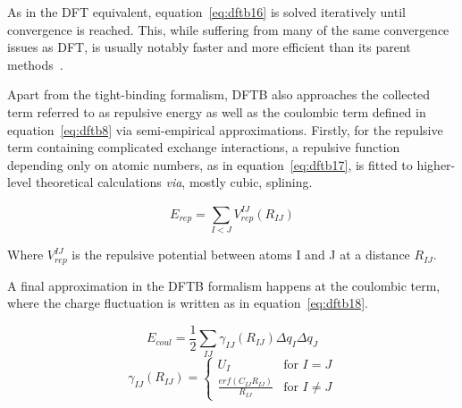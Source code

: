 \documentclass[11pt]{article}
\begin{document}
\bigskip

\noindent As in the DFT equivalent, equation~\ref{eq:dftb16} is solved iteratively until convergence is reached.
This, while suffering from many of the same convergence issues as DFT, is usually notably faster and more efficient than its parent methods~\cite{Elstner2014-zp}.
\\ \par \noindent Apart from the tight-binding formalism, DFTB also approaches the collected term referred to as repulsive energy as well as the coulombic term defined in equation~\ref{eq:dftb8} via semi-empirical approximations.
Firstly, for the repulsive term containing complicated exchange interactions, a repulsive function depending only on atomic numbers, as in equation~\ref{eq:dftb17}, is fitted to higher-level theoretical calculations \textit{via}, mostly cubic, splining.

\begin{equation}
  E_{rep} = \sum_{I<J}^{}V_{rep}^{IJ}(R_{IJ})
  \label{eq:dftb17}
\end{equation}

\bigskip

\noindent Where $V_{rep}^{IJ}$ is the repulsive potential between atoms I and J at a distance $R_{IJ}$.
\\ \par \noindent A final approximation in the DFTB formalism happens at the coulombic term, where the charge fluctuation is written as in equation~\ref{eq:dftb18}.

\begin{equation}
  E_{coul} = \frac{1}{2}\sum_{IJ}^{}\gamma_{IJ}(R_{IJ})\Delta q_I \Delta q_J
  \label{eq:dftb18}
\end{equation}
\begin{equation*}
  \gamma_{IJ}(R_{IJ}) = \begin{cases}
    U_I & \text{for } I = J \\
    \frac{erf(C_{IJ}R_{IJ})}{R_{IJ}} & \text{for } I \neq J
  \end{cases}
\end{equation*}

\bigskip
\end{document}
